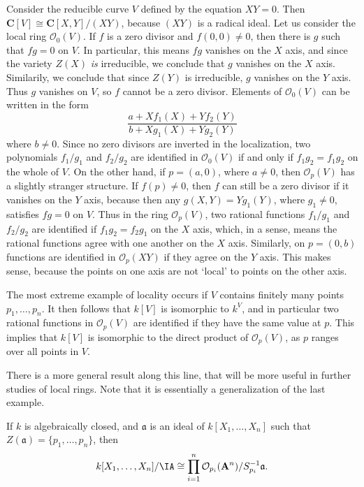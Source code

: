 \begin{example}
    Consider the reducible curve $V$ defined by the equation $XY = 0$. Then $\mathbf{C}[V] \cong \mathbf{C}[X,Y]/(XY)$, because $(XY)$ is a radical ideal. Let us consider the local ring $\mathcal{O}_0(V)$. If $f$ is a zero divisor and $f(0,0) \neq 0$, then there is $g$ such that $fg = 0$ on $V$. In particular, this means $fg$ vanishes on the $X$ axis, and since the variety $Z(X)$ {\it is} irreducible, we conclude that $g$ vanishes on the $X$ axis. Similarily, we conclude that since $Z(Y)$ is irreducible, $g$ vanishes on the $Y$ axis. Thus $g$ vanishes on $V$, so $f$ cannot be a zero divisor. Elements of $\mathcal{O}_0(V)$ can be written in the form
    \[ \frac{a + Xf_1(X) + Yf_2(Y)}{b + Xg_1(X) + Yg_2(Y)} \]
    where $b \neq 0$. Since no zero divisors are inverted in the localization, two polynomials $f_1/g_1$ and $f_2/g_2$ are identified in $\mathcal{O}_0(V)$ if and only if $f_1g_2 = f_1g_2$ on the whole of $V$. On the other hand, if $p = (a,0)$, where $a \neq 0$, then $\mathcal{O}_p(V)$ has a slightly stranger structure. If $f(p) \neq 0$, then $f$ can still be a zero divisor if it vanishes on the $Y$ axis, because then any $g(X,Y) = Yg_1(Y)$, where $g_1 \neq 0$, satisfies $fg = 0$ on $V$. Thus in the ring $\mathcal{O}_p(V)$, two rational functions $f_1/g_1$ and $f_2/g_2$ are identified if $f_1g_2 = f_2g_1$ on the $X$ axis, which, in a sense, means the rational functions agree with one another on the $X$ axis. Similarly, on $p = (0,b)$ functions are identified in $\mathcal{O}_p(XY)$ if they agree on the $Y$ axis. This makes sense, because the points on one axis are not `local' to points on the other axis.
\end{example}

\begin{example}
    The most extreme example of locality occurs if $V$ contains finitely many points $p_1, \dots, p_n$. It then follows that $k[V]$ is isomorphic to $k^V$, and in particular two rational functions in $\mathcal{O}_p(V)$ are identified if they have the same value at $p$. This implies that $k[V]$ is isomorphic to the direct product of $\mathcal{O}_p(V)$, as $p$ ranges over all points in $V$.
\end{example}

There is a more general result along this line, that will be more useful in further studies of local rings. Note that it is essentially a generalization of the last example.

\begin{theorem}
    If $k$ is algebraically closed, and $\mathfrak{a}$ is an ideal of $k[X_1,\dots,X_n]$ such that $Z(\mathfrak{a}) = \{ p_1,\dots,p_n \}$, then
    \[ k[X_1,\dots,X_n]/\IA \cong \prod_{i = 1}^n \mathcal{O}_{p_i}(\mathbf{A}^n) / S_{p_i}^{-1} \mathfrak{a}. \]
\end{theorem}

